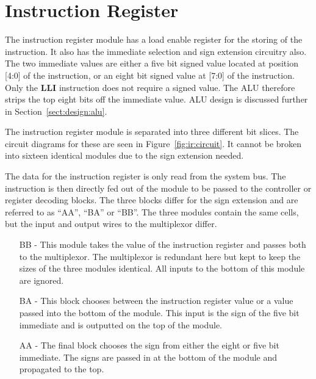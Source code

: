 
\section{Instruction Register}


The instruction register module has a load enable register for the storing of the instruction.
It also has the immediate selection and sign extension circuitry also.
The two immediate values are either a five bit signed value located at position [4:0] of the instruction, or an eight bit signed value at [7:0] of the instruction.
Only the \textbf{LLI} instruction does not require a signed value. 
The ALU therefore strips the top eight bits off the immediate value. 
ALU design is discussed further in Section~\ref{sect:design:alu}.


The instruction register module is separated into three different bit slices.
The circuit diagrams for these are seen in Figure~\ref{fig:ir:circuit}.
It cannot be broken into sixteen identical modules due to the sign extension needed.

The data for the instruction register is only read from the system bus. 
The instruction is then directly fed out of the module to be passed to the controller or register decoding blocks.
The three blocks differ for the sign extension and are referred to as ``AA'', ``BA'' or ``BB''.
The three modules contain the same cells, but the input and output wires to the multiplexor differ. 
\begin{enumerate}
\item[BB] - This module takes the value of the instruction register and passes both to the multiplexor. The multiplexor is redundant here but kept to keep the sizes of the three modules identical. All inputs to the bottom of this module are ignored.
\item[BA] - This block chooses between the instruction register value or a value passed into the bottom of the module. This input is the sign of the five bit immediate and is outputted on the top of the module.
\item[AA] - The final block chooses the sign from either the eight or five bit immediate. The signs are passed in at the bottom of the module and propagated to the top. 
\end{enumerate}

